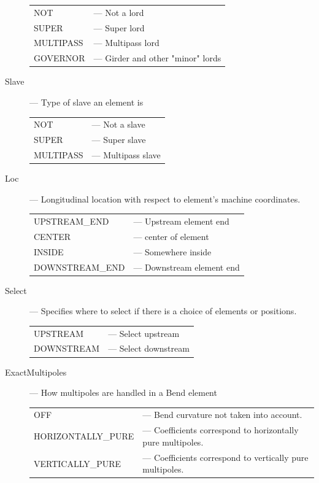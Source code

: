 \begin{description}
\hspace*{-20pt}
\begin{tabular}{ll}
  NOT       & --- Not a lord \\
  SUPER     & --- Super lord \\
  MULTIPASS & --- Multipass lord \\
  GOVERNOR  & --- Girder and other "minor" lords \\ 
\end{tabular}
%
\item[Slave] --- Type of slave an element is \Newline
\hspace*{-20pt}
\begin{tabular}{ll}
  NOT       & --- Not a slave \\
  SUPER     & --- Super slave \\
  MULTIPASS & --- Multipass slave \\
\end{tabular}
%
\item[Loc] --- Longitudinal location with respect to element's machine coordinates. \Newline
\hspace*{-20pt}
\begin{tabular}{ll}
  UPSTREAM_END   & --- Upstream element end\\
  CENTER         & --- center of element \\
  INSIDE         & --- Somewhere inside \\
  DOWNSTREAM_END & --- Downstream element end \\
\end{tabular}
%
\item[Select] --- Specifies where to select if there is a choice of elements or positions. \Newline
\hspace*{-20pt}
\begin{tabular}{ll}
  UPSTREAM   & --- Select upstream \\
  DOWNSTREAM & --- Select downstream \\
\end{tabular}
%
\item[ExactMultipoles] --- How multipoles are handled in a Bend element \Newline
\hspace*{-20pt}
\begin{tabular}{ll}
  OFF               & --- Bend curvature not taken into account. \\
  HORIZONTALLY_PURE & --- Coefficients correspond to horizontally pure multipoles. \\
  VERTICALLY_PURE   & --- Coefficients correspond to vertically pure multipoles. \\

\end{tabular}
\end{description}
